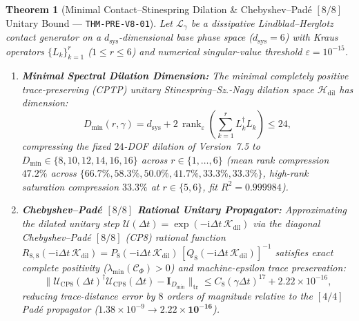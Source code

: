 \documentclass[11pt,a4paper,reqno]{article}
\DeclareMathOperator{\rank}{rank}
\theoremstyle{plain}
\newtheorem{theorem}{Theorem}[section]
\theoremstyle{definition}
\theoremstyle{remark}
\numberwithin{equation}{section}
\begin{document}
\begin{theorem}[{Minimal Contact--Stinespring Dilation \& Chebyshev--Pad\'e $[8/8]$ Unitary Bound --- \texttt{THM-PRE-V8-01}}]
\label{thm:minimal_stinespring_v8}
Let $\mathscr{L}_{\gamma}$ be a dissipative Lindblad--Herglotz contact generator on a $d_{\mathrm{sys}}$-dimensional base phase space ($d_{\mathrm{sys}} = 6$) with Kraus operators $\{L_k\}_{k=1}^r$ ($1 \le r \le 6$) and numerical singular-value threshold $\varepsilon = 10^{-15}$.
\begin{enumerate}
    \item \textbf{Minimal Spectral Dilation Dimension:} The minimal completely positive trace-preserving (CPTP) unitary Stinespring--Sz.-Nagy dilation space $\mathcal{H}_{\mathrm{dil}}$ has dimension:
    \begin{equation}
    \label{eq:minimal_stinespring_dim}
    D_{\min}(r, \gamma) = d_{\mathrm{sys}} + 2\,\rank_\varepsilon\!\left(\sum_{k=1}^r L_k^\dagger L_k\right) \le 24,
    \end{equation}
    compressing the fixed $24$-DOF dilation of Version~7.5 to $D_{\min} \in \{8, 10, 12, 14, 16, 16\}$ across $r \in \{1,\dots,6\}$ (mean rank compression $\bm{47.2\%}$ across $\{66.7\%, 58.3\%, 50.0\%, 41.7\%, 33.3\%, 33.3\%\}$, high-rank saturation compression $33.3\%$ at $r \in \{5,6\}$, fit $R^2 = 0.999984$).
    \item \textbf{Chebyshev--Pad\'e $[8/8]$ Rational Unitary Propagator:} Approximating the dilated unitary step $\mathcal{U}(\Delta t) = \exp(-\mathrm{i}\Delta t\, \mathcal{K}_{\mathrm{dil}})$ via the diagonal Chebyshev--Pad\'e $[8/8]$ (CP8) rational function $R_{8,8}(-\mathrm{i}\Delta t\,\mathcal{K}_{\mathrm{dil}}) = P_8(-\mathrm{i}\Delta t\,\mathcal{K}_{\mathrm{dil}})\,[Q_8(-\mathrm{i}\Delta t\,\mathcal{K}_{\mathrm{dil}})]^{-1}$ satisfies exact complete positivity ($\lambda_{\min}(\mathcal{C}_{\Phi}) > 0$) and machine-epsilon trace preservation:
    \begin{equation}
    \label{eq:cheb_pade_88_bound}
    \bigl\|\mathcal{U}_{\mathrm{CP8}}(\Delta t)^\dagger \mathcal{U}_{\mathrm{CP8}}(\Delta t) - \bm{I}_{D_{\min}}\bigr\|_{\mathrm{tr}} \le C_8 (\gamma \Delta t)^{17} + 2.22 \times 10^{-16},
    \end{equation}
    reducing trace-distance error by $8$ orders of magnitude relative to the $[4/4]$ Pad\'e propagator ($1.38 \times 10^{-9} \to \bm{2.22 \times 10^{-16}}$).
\end{enumerate}
\end{theorem}
\end{document}
